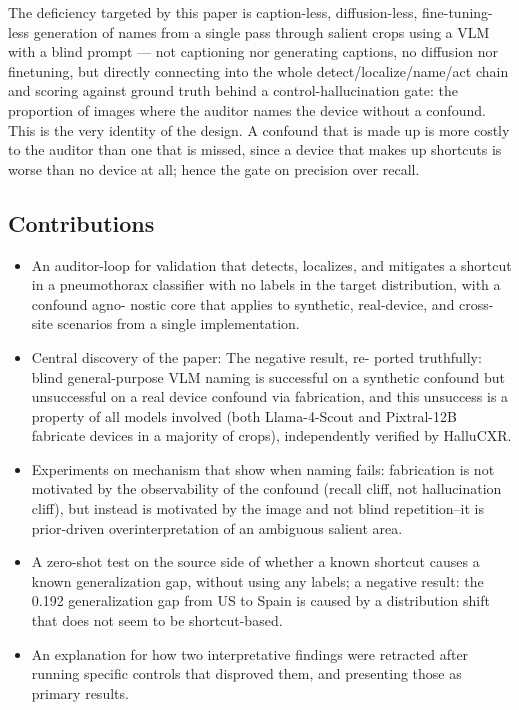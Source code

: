 \documentclass{ieeeaccess}
\begin{document}
The deficiency targeted by this paper is caption-less, diffusion-less, fine-tuning-less generation of names from a single pass through salient crops using a VLM with a blind prompt — not captioning nor generating captions, no diffusion nor finetuning, but directly connecting into the whole detect/localize/name/act chain and scoring against ground truth behind a control-hallucination gate: the proportion of images where the auditor names the device without a confound. This is the very identity of the design. A confound that is made up is more costly to the auditor than one that is missed, since a device that makes up shortcuts is worse than no device at all; hence the gate on precision over recall.

\subsection{Contributions}
\begin{itemize}
\item An auditor-loop for validation that detects, localizes, and
mitigates a shortcut in a pneumothorax classifier with
no labels in the target distribution, with a confound agno-
nostic core that applies to synthetic, real-device, and cross-
site scenarios from a single implementation.
\item Central discovery of the paper: The negative result, re-
ported truthfully: blind general-purpose VLM naming is
successful on a synthetic confound but unsuccessful on a
real device confound via fabrication, and this unsuccess is
a property of all models involved (both Llama-4-Scout
and Pixtral-12B fabricate devices in a majority of crops),
independently verified by HalluCXR.
\item Experiments on mechanism that show when naming fails: fabrication is not
motivated by the observability of the confound (recall cliff, not
hallucination cliff), but instead is motivated by the image and not
blind repetition--it is prior-driven overinterpretation of an ambiguous
salient area.
\item A zero-shot test on the source side of whether a known shortcut
causes a known generalization gap, without using any labels; a negative
result: the 0.192 generalization gap from US to Spain is caused by a
distribution shift that does not seem to be shortcut-based.
\item An explanation for how two interpretative findings were retracted
after running specific controls that disproved them, and presenting those
as primary results.
\end{itemize}
\end{document}
